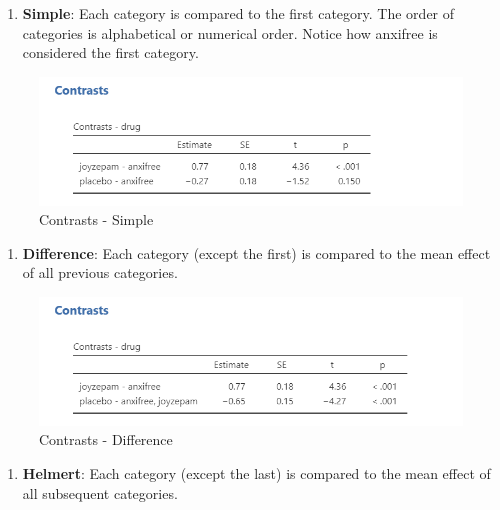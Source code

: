 \documentclass[
]{book}
\providecommand{\tightlist}{%
  \setlength{\itemsep}{0pt}\setlength{\parskip}{0pt}}
\begin{document}
\begin{enumerate}
\def\labelenumi{\arabic{enumi}.}
\setcounter{enumi}{1}
\tightlist
\item
  \textbf{Simple}: Each category is compared to the first category. The order of categories is alphabetical or numerical order. Notice how anxifree is considered the first category.
\end{enumerate}

\begin{figure}

{\centering \includegraphics[width=1\linewidth]{images/04_one-way-anova/contrasts_simple} 

}

\caption{Contrasts - Simple}\label{fig:unnamed-chunk-10}
\end{figure}

\begin{enumerate}
\def\labelenumi{\arabic{enumi}.}
\setcounter{enumi}{2}
\tightlist
\item
  \textbf{Difference}: Each category (except the first) is compared to the mean effect of all previous categories.
\end{enumerate}

\begin{figure}

{\centering \includegraphics[width=1\linewidth]{images/04_one-way-anova/contrasts_difference} 

}

\caption{Contrasts - Difference}\label{fig:unnamed-chunk-11}
\end{figure}

\begin{enumerate}
\def\labelenumi{\arabic{enumi}.}
\setcounter{enumi}{3}
\tightlist
\item
  \textbf{Helmert}: Each category (except the last) is compared to the mean effect of all subsequent categories.
\end{enumerate}
\end{document}
